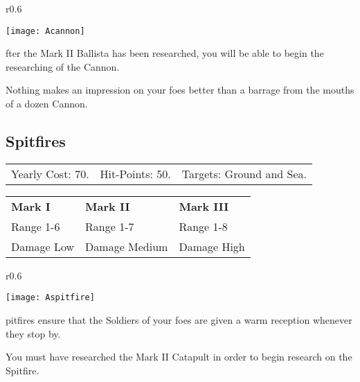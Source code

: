 \begin{wrapfigure}{r}{0.6\textwidth}
    \vspace{-20pt}
    \begin{center}
        \texttt{[image: Acannon]} %
    \end{center}
    \vspace{-50pt}
\end{wrapfigure}

fter the Mark II Ballista has been researched, you will be able to begin the researching of the Cannon.

Nothing makes an impression on your foes better than a barrage from the mouths of a dozen Cannon.

\clearpage  %

\subsection{\textsf{Spitfires}}


\begin{tabular}{p{1.264in} p{1.264in} p{1.264in}}
    Yearly Cost: 70. & Hit-Points: 50. & Targets: Ground and Sea.
\end{tabular}

\begin{tabular}{| p{1.264in} p{1.264in} p{1.264in}|}
    \hline
    \textbf{Mark I}    & \textbf{Mark II} & \textbf{Mark III} \\ 
    Range 1-6 & Range 1-7 & Range 1-8 \\ 
    Damage Low & Damage Medium & Damage High \\ 
    \hline
\end{tabular}

\begin{wrapfigure}{r}{0.6\textwidth}
    \vspace{-20pt}
    \begin{center}
        \texttt{[image: Aspitfire]} %
    \end{center}
    \vspace{-20pt}
\end{wrapfigure}

pitfires ensure that the Soldiers of your foes are given a warm reception whenever they stop by.

You must have researched the Mark II Catapult in order to begin research on the Spitfire. 

